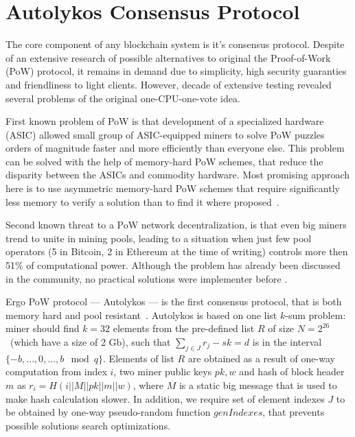 \section{Autolykos Consensus Protocol}
\label{sec:autolykos}


The core component of any blockchain system is it's consensus protocol.
Despite of an extensive research of possible alternatives to original the Proof-of-Work (PoW) protocol,
it remains in demand due to simplicity, high security guaranties and friendliness to light clients.
However, decade of extensive testing revealed several problems of the original one-CPU-one-vote idea.

First known problem of PoW is that development of a specialized hardware (ASIC) allowed
small group of ASIC-equipped miners to solve PoW puzzles orders of magnitude faster and more efficiently
than everyone else. This problem can be solved with the help of memory-hard PoW schemes,
that reduce the disparity between the ASICs and commodity hardware. Most promising approach here
is to use asymmetric memory-hard PoW schemes that require significantly less memory
to verify a solution than to find it where proposed~\cite{biryukov2017equihash,ethHash}.

Second known threat to a PoW network decentralization, is that even big miners trend to unite in
mining pools, leading to a situation when just few pool operators (5 in Bitcoin, 2 in Ethereum
at the time of writing) controls more then 51\% of computational power.
Although the problem has already been discussed in the community, no practical solutions were
implementer before \Ergo{}.


Ergo PoW protocol --- Autolykos --- is the first consensus protocol, that is both memory hard
and pool resistant~\cite{Ergopow}.
Autolykos is based on one list $k$-sum problem: miner should find
$k=32$ elements from the pre-defined list $R$ of size $N=2^{26}$~(which have a size of 2 Gb),
such that $\sum_{j \in J} r_{j} - sk = d$ is in the interval $\{-b,\dots,0,\dots,b\mod q\}$.
Elements of list $R$ are obtained as a result of one-way computation from index $i$,
two miner public keys $pk,w$ and hash of block header $m$ as $r_i=H(i||M||pk||m||w)$,
where $M$ is a static big message that is used to make hash calculation slower.
In addition, we require set of element indexes $J$ to be obtained
by one-way pseudo-random function $genIndexes$, that prevents possible solutions
search optimizations.

